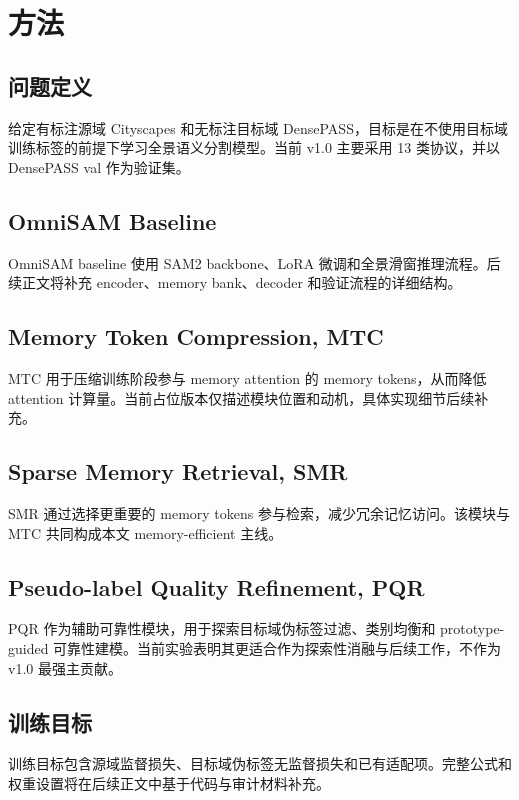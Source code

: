 \section{方法}
\label{sec:method}

\subsection{问题定义}
给定有标注源域 Cityscapes 和无标注目标域 DensePASS，目标是在不使用目标域训练标签的前提下学习全景语义分割模型。当前 v1.0 主要采用 13 类协议，并以 DensePASS val 作为验证集。

\subsection{OmniSAM Baseline}
OmniSAM baseline 使用 SAM2 backbone、LoRA 微调和全景滑窗推理流程。后续正文将补充 encoder、memory bank、decoder 和验证流程的详细结构。

\subsection{Memory Token Compression, MTC}
MTC 用于压缩训练阶段参与 memory attention 的 memory tokens，从而降低 attention 计算量。当前占位版本仅描述模块位置和动机，具体实现细节后续补充。

\subsection{Sparse Memory Retrieval, SMR}
SMR 通过选择更重要的 memory tokens 参与检索，减少冗余记忆访问。该模块与 MTC 共同构成本文 memory-efficient 主线。

\subsection{Pseudo-label Quality Refinement, PQR}
PQR 作为辅助可靠性模块，用于探索目标域伪标签过滤、类别均衡和 prototype-guided 可靠性建模。当前实验表明其更适合作为探索性消融与后续工作，不作为 v1.0 最强主贡献。

\subsection{训练目标}
训练目标包含源域监督损失、目标域伪标签无监督损失和已有适配项。完整公式和权重设置将在后续正文中基于代码与审计材料补充。
